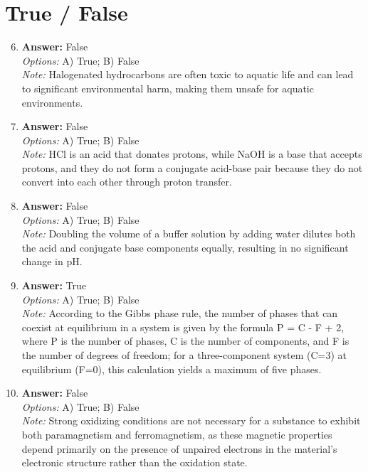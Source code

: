 \documentclass[12pt]{article}
\begin{document}
\section*{True / False}
\begin{enumerate}[label=\arabic*.]
\setcounter{enumi}{5}
\item \textbf{Answer:} False
\\ \textit{Options:} A) True; B) False
\\ \textit{Note:} Halogenated hydrocarbons are often toxic to aquatic life and can lead to significant environmental harm, making them unsafe for aquatic environments.
\item \textbf{Answer:} False
\\ \textit{Options:} A) True; B) False
\\ \textit{Note:} HCl is an acid that donates protons, while NaOH is a base that accepts protons, and they do not form a conjugate acid-base pair because they do not convert into each other through proton transfer.
\item \textbf{Answer:} False
\\ \textit{Options:} A) True; B) False
\\ \textit{Note:} Doubling the volume of a buffer solution by adding water dilutes both the acid and conjugate base components equally, resulting in no significant change in pH.
\item \textbf{Answer:} True
\\ \textit{Options:} A) True; B) False
\\ \textit{Note:} According to the Gibbs phase rule, the number of phases that can coexist at equilibrium in a system is given by the formula P = C - F + 2, where P is the number of phases, C is the number of components, and F is the number of degrees of freedom; for a three-component system (C=3) at equilibrium (F=0), this calculation yields a maximum of five phases.
\item \textbf{Answer:} False
\\ \textit{Options:} A) True; B) False
\\ \textit{Note:} Strong oxidizing conditions are not necessary for a substance to exhibit both paramagnetism and ferromagnetism, as these magnetic properties depend primarily on the presence of unpaired electrons in the material's electronic structure rather than the oxidation state.
\end{enumerate}
\end{document}
